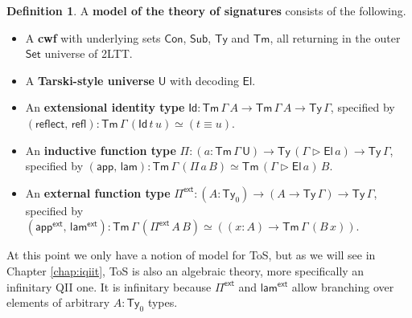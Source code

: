 \documentclass[12pt,a4paper,twoside,openany]{book}
\theoremstyle{remark}
\theoremstyle{definition}
\newtheorem{mydefinition}{Definition}
\theoremstyle{theorem}
\newcommand{\ms}[1]{\mathsf{#1}}
\newcommand{\refl}{\mathsf{refl}}
\newcommand{\reflect}{\mathsf{reflect}}
\newcommand{\Con}{\mathsf{Con}}
\newcommand{\Sub}{\mathsf{Sub}}
\newcommand{\Tm}{\mathsf{Tm}}
\newcommand{\Ty}{\mathsf{Ty}}
\newcommand{\U}{\mathsf{U}}
\newcommand{\El}{\mathsf{El}}
\newcommand{\Id}{\mathsf{Id}}
\newcommand{\Set}{\mathsf{Set}}
\newcommand{\ext}{\triangleright}
\newcommand{\Pie}{\Pi^{\mathsf{ext}}}
\newcommand{\appe}{\mathsf{app^{ext}}}
\newcommand{\lame}{\mathsf{lam^{ext}}}
\newcommand{\app}{\ms{app}}
\newcommand{\lam}{\ms{lam}}
\begin{document}
\begin{mydefinition}
\label{def:fqiit-tos}
A \textbf{model of the theory of signatures} consists of the following.
  \begin{itemize}
    \item A \textbf{cwf} with underlying sets $\Con$, $\Sub$, $\Ty$ and $\Tm$, all returning in
      the outer $\Set$ universe of 2LTT.
    \item A \textbf{Tarski-style universe} $\U$ with decoding $\El$.
    \item An \textbf{extensional identity type} $\Id : \Tm\,\Gamma\,A \to
      \Tm\,\Gamma\,A \to \Ty\,\Gamma$, specified by $(\reflect,\,\refl) :
      \Tm\,\Gamma\,(\Id\,t\,u) \simeq (t \equiv u)$.
    \item An \textbf{inductive function type} $\Pi : (a : \Tm\,\Gamma\,\U) \to
      \Ty\,(\Gamma\ext\El\,a) \to \Ty\,\Gamma$, specified by
      $(\app,\,\lam) : \Tm\,\Gamma\,(\Pi\,a\,B) \simeq \Tm\,(\Gamma \ext \El\,a)\,B$.
    \item An \textbf{external function type} $\Pie : (A : \Ty_0) \to (A \to \Ty\,\Gamma) \to \Ty\,\Gamma$, specified by
      $(\appe,\,\lame) : \Tm\,\Gamma\,(\Pie\,A\,B) \simeq ((x : A) \to \Tm\,\Gamma\,(B\,x))$.
  \end{itemize}
\end{mydefinition}
At this point we only have a notion of model for ToS, but as we will see in
Chapter \ref{chap:iqiit}, ToS is also an algebraic theory, more specifically an
infinitary QII one. It is infinitary because $\Pie$ and $\lame$ allow branching
over elements of arbitrary $A : \Ty_0$ types.
\end{document}
